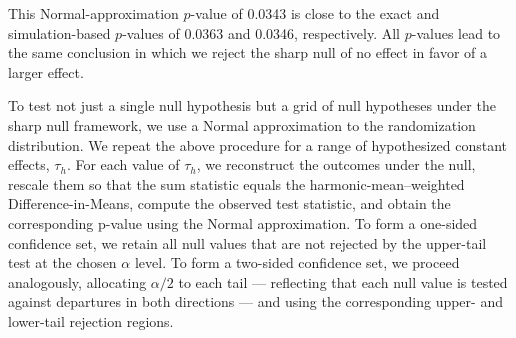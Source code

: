 \documentclass[
  12pt,
  leqno]{article}
\newenvironment{Shaded}{\begin{snugshade}}{\end{snugshade}}
\newcommand{\AttributeTok}[1]{\textcolor[rgb]{0.13,0.29,0.53}{#1}}
\newcommand{\CommentTok}[1]{\textcolor[rgb]{0.56,0.35,0.01}{\textit{#1}}}
\newcommand{\ConstantTok}[1]{\textcolor[rgb]{0.56,0.35,0.01}{#1}}
\newcommand{\FunctionTok}[1]{\textcolor[rgb]{0.13,0.29,0.53}{\textbf{#1}}}
\newcommand{\NormalTok}[1]{#1}
\newcommand{\OtherTok}[1]{\textcolor[rgb]{0.56,0.35,0.01}{#1}}
\newcommand{\SpecialCharTok}[1]{\textcolor[rgb]{0.81,0.36,0.00}{\textbf{#1}}}
\begin{document}
\begin{Shaded}
\end{Shaded}

\doublespacing

This Normal-approximation \(p\)-value of 0.0343 is close to the exact
and simulation-based \(p\)-values of 0.0363 and 0.0346, respectively.
All \(p\)-values lead to the same conclusion in which we reject the
sharp null of no effect in favor of a larger effect.

To test not just a single null hypothesis but a grid of null hypotheses
under the sharp null framework, we use a Normal approximation to the
randomization distribution. We repeat the above procedure for a range of
hypothesized constant effects, \(\tau_h\). For each value of \(\tau_h\),
we reconstruct the outcomes under the null, rescale them so that the sum
statistic equals the harmonic-mean--weighted Difference-in-Means,
compute the observed test statistic, and obtain the corresponding
p-value using the Normal approximation. To form a one-sided confidence
set, we retain all null values that are not rejected by the upper-tail
test at the chosen \(\alpha\) level. To form a two-sided confidence set,
we proceed analogously, allocating \(\alpha/2\) to each tail ---
reflecting that each null value is tested against departures in both
directions --- and using the corresponding upper- and lower-tail
rejection regions.
\end{document}
